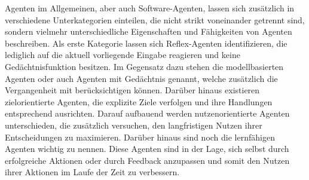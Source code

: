 Agenten im Allgemeinen, aber auch Software-Agenten, lassen sich zusätzlich in verschiedene Unterkategorien einteilen, die nicht strikt voneinander getrennt sind, sondern vielmehr unterschiedliche Eigenschaften und Fähigkeiten von Agenten beschreiben. Als erste Kategorie lassen sich Reflex-Agenten identifizieren, die lediglich auf die aktuell vorliegende Eingabe reagieren und keine Gedächtnisfunktion besitzen. Im Gegensatz dazu stehen die modellbasierten Agenten oder auch Agenten mit Gedächtnis genannt, welche zusätzlich die Vergangenheit mit berücksichtigen können. Darüber hinaus existieren zielorientierte Agenten, die explizite Ziele verfolgen und ihre Handlungen entsprechend ausrichten. Darauf aufbauend werden nutzenorientierte Agenten unterschieden, die zusätzlich versuchen, den langfristigen Nutzen ihrer Entscheidungen zu maximieren. Darüber hinaus sind noch die lernfähigen Agenten wichtig zu nennen. Diese Agenten sind in der Lage, sich selbst durch erfolgreiche Aktionen oder durch Feedback anzupassen und somit den Nutzen ihrer Aktionen im Laufe der Zeit zu verbessern. \cite[\pagef 23f]{ertel_grundkurs_2024}

